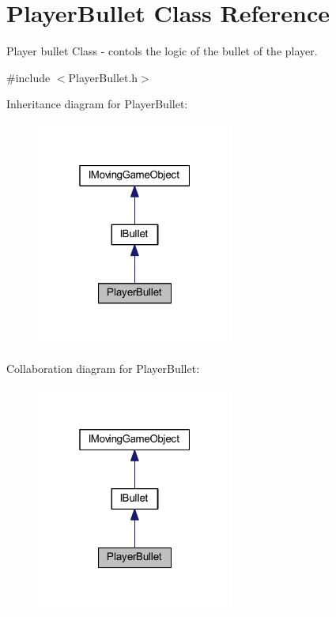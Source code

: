 \hypertarget{class_player_bullet}{}\section{Player\+Bullet Class Reference}
\label{class_player_bullet}


Player bullet Class -\/ contols the logic of the bullet of the player.  




{\ttfamily \#include $<$Player\+Bullet.\+h$>$}



Inheritance diagram for Player\+Bullet\+:\nopagebreak
\begin{figure}[H]
\begin{center}
\leavevmode
\includegraphics[width=184pt]{class_player_bullet__inherit__graph}
\end{center}
\end{figure}


Collaboration diagram for Player\+Bullet\+:\nopagebreak
\begin{figure}[H]
\begin{center}
\leavevmode
\includegraphics[width=184pt]{class_player_bullet__coll__graph}
\end{center}
\end{figure}
